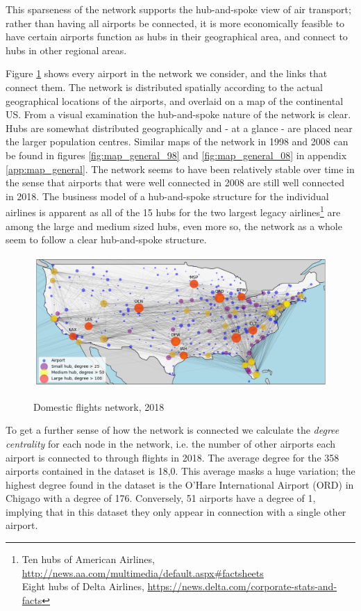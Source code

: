 This sparseness of the network supports the hub-and-spoke view of air transport; rather than having all airports be connected, it is more economically feasible to have certain airports function as hubs in their geographical area, and connect to hubs in other regional areas.
\par
Figure \ref{fig:map_general_18} shows every airport in the network we consider, and the links that connect them. The network is distributed spatially according to the actual geographical locations of the airports, and overlaid on a map of the continental US. From a visual examination the hub-and-spoke nature of the network is clear. Hubs are somewhat distributed geographically and - at a glance - are placed near the larger population centres. Similar maps of the network in 1998 and 2008 can be found in figures \ref{fig:map_general_98} and \ref{fig:map_general_08} in appendix \ref{app:map_general}. The network seems to have been relatively stable over time in the sense that airports that were well connected in 2008 are still well connected in 2018. The business model of a hub-and-spoke structure for the individual airlines is apparent as all of the 15 hubs for the two largest legacy airlines\footnote{Ten hubs of American Airlines, \url{http://news.aa.com/multimedia/default.aspx#factsheets}\\
Eight hubs of Delta Airlines, \url{https://news.delta.com/corporate-stats-and-facts}} are among the large and medium sized hubs, even more so, the network as a whole seem to follow a clear hub-and-spoke structure.
\begin{figure}[H]
  \centering
  \caption{Domestic flights network, 2018}
    \includegraphics[width=1. \textwidth]{Exam/Figures/map_general_18}
    \vspace{-0.7cm}
  \label{fig:map_general_18}
\end{figure}
\noindent
To get a further sense of how the network is connected we calculate the \textit{degree centrality} for each node in the network, i.e. the number of other airports each airport is connected to through flights in 2018. The average degree for the 358 airports contained in the dataset is 18,0. This average masks a huge variation; the highest degree found in the dataset is the O'Hare International Airport (ORD) in Chigago with a degree of 176.  Conversely, 51 airports have a degree of 1, implying that in this dataset they only appear in connection with a single other airport. 
